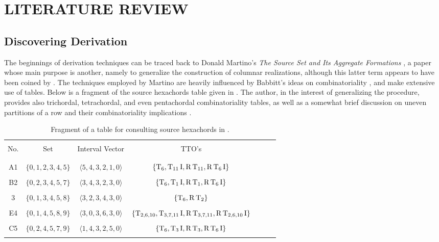 \chapter{LITERATURE REVIEW}

\section{Discovering Derivation}

The beginnings of derivation techniques can be traced back to Donald Martino's \emph{The Source Set and Its Aggregate Formations} \cite{Martino1961}, a paper whose main purpose is another, namely to generalize the construction of columnar realizations, although this latter term appears to have been coined by \cite{Starr1984}. The techniques employed by Martino are heavily influenced by Babbitt's ideas on combinatoriality \cite[224]{Martino1961}, and make extensive use of tables. Below is a fragment of the source hexachords table given in \cite[229]{Martino1961}. The author, in the interest of generalizing the procedure, provides also trichordal, tetrachordal, and even pentachordal combinatoriality tables, as well as a somewhat brief discussion on uneven partitions of a row and their combinatoriality implications \cite[267]{Martino1961}.

\begin{table}[htbp]
    \caption[Martino's Source Hexachords]{Fragment of a table for consulting source hexachords in \cite[229]{Martino1961}.}
    \centering
    \vspace{12pt}
    \begin{tabular}{c|cccccc}
        \hline\\
        No. & Set & Interval Vector & TTO's \\\\
        \hline\\
        A1 & $\{0,1,2,3,4,5\}$ & $\langle 5,4,3,2,1,0 \rangle$ & $\{\operatorname{T}_6,\operatorname{T}_{11}\operatorname{I},\operatorname{R}\operatorname{T}_{11},\operatorname{R}\operatorname{T}_6\operatorname{I}\}$ \\\\
        B2 & $\{0,2,3,4,5,7\}$ & $\langle 3,4,3,2,3,0 \rangle$ & $\{\operatorname{T}_6,\operatorname{T}_{1}\operatorname{I},\operatorname{R}\operatorname{T}_{1},\operatorname{R}\operatorname{T}_6\operatorname{I}\}$ \\\\
        3 & $\{0,1,3,4,5,8\}$ & $\langle 3,2,3,4,3,0 \rangle$ & $\{\operatorname{T}_6,\operatorname{R}\operatorname{T}_2\}$ \\\\
        E4 & $\{0,1,4,5,8,9\}$ & $\langle 3,0,3,6,3,0 \rangle$ & $\{\operatorname{T}_{2,6,10},\operatorname{T}_{3,7,11}\operatorname{I},\operatorname{R}\operatorname{T}_{3,7,11},\operatorname{R}\operatorname{T}_{2,6,10}\operatorname{I}\}$ \\\\
        C5 & $\{0,2,4,5,7,9\}$ & $\langle 1,4,3,2,5,0 \rangle$ & $\{\operatorname{T}_6,\operatorname{T}_{3}\operatorname{I},\operatorname{R}\operatorname{T}_{3},\operatorname{R}\operatorname{T}_6\operatorname{I}\}$ \\\\
        \hline
    \end{tabular}
\end{table}

